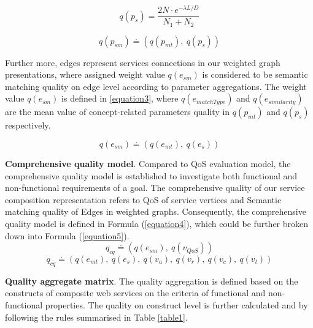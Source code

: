 \documentclass{llncs}
\begin{document}
\begin{equation}
q(p_ {s}){=} \frac{2N \cdot e^{-\lambda L/D} }{N_{1}+N_{2}}
\label{equation1}
\end{equation}

\begin{equation}
\label{equation2}
q(p_{sm}) \stackrel{.}{=} (q(p_ {mt}), \  q(p_ {s}))
\end{equation}

Further more, edges represent services connections in our weighted graph presentations, where assigned weight value $q(e_{sm})$ is considered to be semantic matching quality on edge level according to parameter aggregations. The weight value $q(e_{sm})$ is defined in \ref{equation3}, where $q(e_ {matchType})$ and $q(e_ {similarity})$ are the mean value of concept-related parameters quality in $q(p_{mt})$ and $q(p_{s})$ respectively. 

\begin{equation}
\label{equation3}
q(e_{sm}) \stackrel{.}{=} (q(e_ {mt}), \  q(e_ {s}))
\end{equation}

\textbf{Comprehensive quality model}. Compared to QoS evaluation model, the comprehensive quality model is established to investigate both functional and non-functional requirements of a goal. The comprehensive quality of our service composition representation refers to QoS of service vertices and Semantic matching quality of Edges in weighted graphs. Consequently, the comprehensive quality model is defined in Formula (\ref{equation4}), which could be further broken down into Formula (\ref{equation5}). 
\begin{equation}
\label{equation4}
q_{cq} \stackrel{.}{=} (q(e_ {sm}), \  q(v_ {QoS}))
\end{equation}
\begin{equation}
\label{equation5}
q_{cq} \stackrel{.}{=} (q(e_ {mt}), \  q(e_ {s}), \  q(v_{a}),\  q(v_{r}),\  q(v_{c}),\  q(v_{t}))
\end{equation}

\textbf{Quality aggregate matrix}. The quality aggregation is defined based on the constructs of composite web services on the criteria of functional and non-functional properties. The quality on construct level is further calculated and by following the rules summarised in Table \ref{table1}. 
\end{document}
